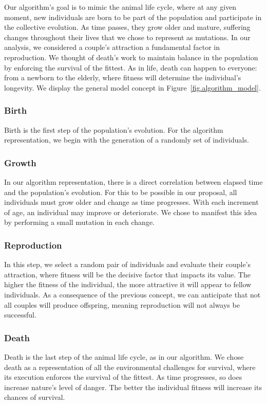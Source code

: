 \documentclass[graybox]{svmult}
\begin{document}
        Our algorithm's goal is to mimic the animal life cycle, where at any
        given moment, new individuals are born to be part of the population and
        participate in the collective evolution. As time passes, they grow
        older and mature, suffering changes throughout their lives that we
        chose to represent as mutations. In our analysis, we considered a
        couple's attraction a fundamental factor in reproduction. We thought of
        death's work to maintain balance in the population by enforcing the
        survival of the fittest. As in life, death can happen to everyone: from
        a newborn to the elderly, where fitness will determine the individual's
        longevity. We display the general model concept in
        Figure~\ref{fig.algorithm_model}.

        \subsubsection{Birth} Birth is the first step of the population's
        evolution. For the algorithm representation, we begin with the
        generation of a randomly set of individuals.
        
        \subsubsection{Growth} In our algorithm representation, there is a
        direct correlation between elapsed time and the population's evolution.
        For this to be possible in our proposal, all individuals must grow
        older and change as time progresses. With each increment of age, an
        individual may improve or deteriorate. We chose to manifest this idea
        by performing a small mutation in each change.

        \subsubsection{Reproduction} In this step, we select a random pair of
        individuals and evaluate their couple's attraction, where fitness will
        be the decisive factor that impacts its value. The higher the fitness
        of the individual, the more attractive it will appear to fellow
        individuals. As a consequence of the previous concept, we can
        anticipate that not all couples will produce offspring, meaning
        reproduction will not always be successful.
        
        \subsubsection{Death} Death is the last step of the animal life cycle,
        as in our algorithm. We chose death as a representation of all the
        environmental challenges for survival, where its execution enforces the
        survival of the fittest. As time progresses, so does increase nature's
        level of danger. The better the individual fitness will increase its
        chances of survival.
        
\end{document}
